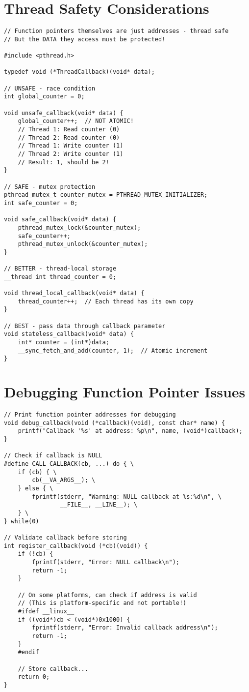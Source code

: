 \section{Thread Safety Considerations}

\begin{lstlisting}
// Function pointers themselves are just addresses - thread safe
// But the DATA they access must be protected!

#include <pthread.h>

typedef void (*ThreadCallback)(void* data);

// UNSAFE - race condition
int global_counter = 0;

void unsafe_callback(void* data) {
    global_counter++;  // NOT ATOMIC!
    // Thread 1: Read counter (0)
    // Thread 2: Read counter (0)
    // Thread 1: Write counter (1)
    // Thread 2: Write counter (1)
    // Result: 1, should be 2!
}

// SAFE - mutex protection
pthread_mutex_t counter_mutex = PTHREAD_MUTEX_INITIALIZER;
int safe_counter = 0;

void safe_callback(void* data) {
    pthread_mutex_lock(&counter_mutex);
    safe_counter++;
    pthread_mutex_unlock(&counter_mutex);
}

// BETTER - thread-local storage
__thread int thread_counter = 0;

void thread_local_callback(void* data) {
    thread_counter++;  // Each thread has its own copy
}

// BEST - pass data through callback parameter
void stateless_callback(void* data) {
    int* counter = (int*)data;
    __sync_fetch_and_add(counter, 1);  // Atomic increment
}
\end{lstlisting}

\section{Debugging Function Pointer Issues}

\begin{lstlisting}
// Print function pointer addresses for debugging
void debug_callback(void (*callback)(void), const char* name) {
    printf("Callback '%s' at address: %p\n", name, (void*)callback);
}

// Check if callback is NULL
#define CALL_CALLBACK(cb, ...) do { \
    if (cb) { \
        cb(__VA_ARGS__); \
    } else { \
        fprintf(stderr, "Warning: NULL callback at %s:%d\n", \
                __FILE__, __LINE__); \
    } \
} while(0)

// Validate callback before storing
int register_callback(void (*cb)(void)) {
    if (!cb) {
        fprintf(stderr, "Error: NULL callback\n");
        return -1;
    }

    // On some platforms, can check if address is valid
    // (This is platform-specific and not portable!)
    #ifdef __linux__
    if ((void*)cb < (void*)0x1000) {
        fprintf(stderr, "Error: Invalid callback address\n");
        return -1;
    }
    #endif

    // Store callback...
    return 0;
}
\end{lstlisting}

